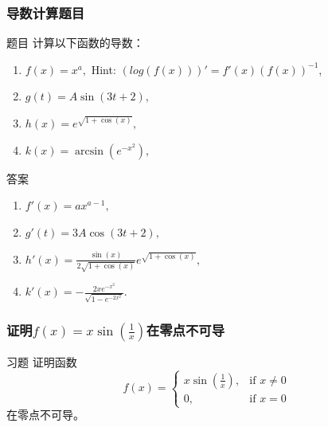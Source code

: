 \documentclass[
10pt,
aspectratio=43,
]{beamer}
\begin{document}
\begin{frame}
	\frametitle{导数计算题目}
	
	\begin{exampleblock}{题目}
		计算以下函数的导数：
		\begin{enumerate}
			\item $f(x) = x^a,$ Hint: $(log(f(x)))'=f'(x)(f(x))^{-1}$,
			\item $g(t) = A \sin(3t+2),$
			\item $h(x) = e^{\sqrt{1+\cos(x)}},$
			\item $k(x) = \arcsin(e^{-x^2}),$
		\end{enumerate}
	\end{exampleblock}
	
	\pause
	
	\begin{exampleblock}{答案}
		\begin{enumerate}
			\item $f'(x) = ax^{a-1},$
			\item $g'(t) = 3A \cos(3t+2),$
			\item $h'(x) = \displaystyle\frac{\sin(x)}{2\sqrt{1+\cos(x)}}e^{\sqrt{1+\cos(x)}},$
			\item $k'(x) = -\displaystyle\frac{2x e^{-x^2}}{\sqrt{1-e^{-2x^2}}}.$
		\end{enumerate}
	\end{exampleblock}
	
\end{frame}

\begin{frame}
	\frametitle{证明$f(x)=x\sin\left(\frac{1}{x}\right)$在零点不可导}
		
	\begin{exampleblock}{习题}
		证明函数
		\[
			f(x) = \begin{cases}
			x\sin\left(\frac{1}{x}\right), & \text{if } x \neq 0 \\
			0, & \text{if } x = 0
			\end{cases}
		\]
		在零点不可导。
	\end{exampleblock}
	
\end{frame}
\end{document}
